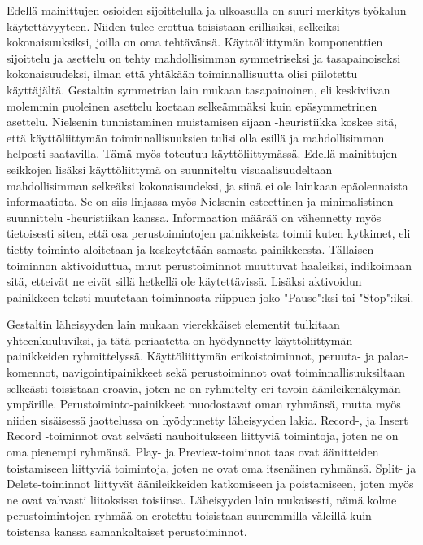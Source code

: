\documentclass[utf8]{gradu3}
\begin{document}
Edellä mainittujen osioiden sijoittelulla ja ulkoasulla on suuri merkitys työkalun käytettävyyteen. Niiden tulee erottua toisistaan erillisiksi, selkeiksi kokonaisuuksiksi, joilla on oma tehtävänsä. Käyttöliittymän komponenttien sijoittelu ja asettelu on tehty mahdollisimman symmetriseksi ja tasapainoiseksi kokonaisuudeksi, ilman että yhtäkään toiminnallisuutta olisi piilotettu käyttäjältä. Gestaltin symmetrian lain mukaan tasapainoinen, eli keskiviivan molemmin puoleinen asettelu koetaan selkeämmäksi kuin epäsymmetrinen asettelu. Nielsenin tunnistaminen muistamisen sijaan -heuristiikka koskee sitä, että käyttöliittymän toiminnallisuuksien tulisi olla esillä ja mahdollisimman helposti saatavilla. Tämä myös toteutuu käyttöliittymässä. Edellä mainittujen seikkojen lisäksi käyttöliittymä on suunniteltu visuaalisuudeltaan mahdollisimman selkeäksi kokonaisuudeksi, ja siinä ei ole lainkaan epäolennaista informaatiota. Se on siis linjassa myös Nielsenin esteettinen ja minimalistinen suunnittelu -heuristiikan kanssa. Informaation määrää on vähennetty myös tietoisesti siten, että osa perustoimintojen painikkeista toimii kuten kytkimet, eli tietty toiminto aloitetaan ja keskeytetään samasta painikkeesta. Tällaisen toiminnon aktivoiduttua, muut perustoiminnot muuttuvat haaleiksi, indikoimaan sitä, etteivät ne eivät sillä hetkellä ole käytettävissä. Lisäksi aktivoidun painikkeen teksti muutetaan toiminnosta riippuen joko "Pause":ksi tai "Stop":iksi.

Gestaltin läheisyyden lain mukaan vierekkäiset elementit tulkitaan yhteenkuuluviksi, ja tätä periaatetta on hyödynnetty käyttöliittymän painikkeiden ryhmittelyssä. Käyttöliittymän erikoistoiminnot, peruuta- ja palaa-komennot, navigointipainikkeet sekä perustoiminnot ovat toiminnallisuuksiltaan selkeästi toisistaan eroavia, joten ne on ryhmitelty eri tavoin äänileikenäkymän ympärille. Perustoiminto-painikkeet muodostavat oman ryhmänsä, mutta myös niiden sisäisessä jaottelussa on hyödynnetty läheisyyden lakia. Record-, ja Insert Record -toiminnot ovat selvästi nauhoitukseen liittyviä toimintoja, joten ne on oma pienempi ryhmänsä. Play- ja Preview-toiminnot taas ovat äänitteiden toistamiseen liittyviä toimintoja, joten ne ovat oma itsenäinen ryhmänsä. Split- ja Delete-toiminnot liittyvät äänileikkeiden katkomiseen ja poistamiseen, joten myös ne ovat vahvasti liitoksissa toisiinsa. Läheisyyden lain mukaisesti, nämä kolme perustoimintojen ryhmää on erotettu toisistaan suuremmilla väleillä kuin toistensa kanssa samankaltaiset perustoiminnot. 
\end{document}

